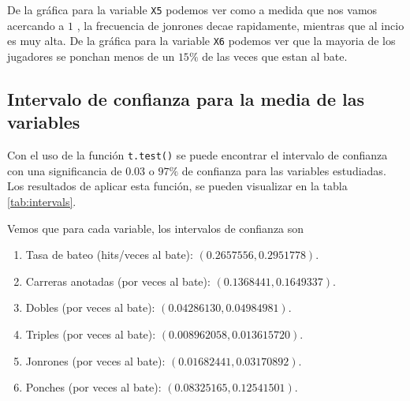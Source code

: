 \documentclass{staprojteamusb}
\begin{document}
 De la gráfica para la variable \texttt{X5} podemos ver como a medida que nos vamos acercando a \(1\) , la frecuencia de jonrones decae rapidamente, mientras que al incio es muy alta. De la gráfica para la variable \texttt{X6} podemos ver que la mayoria de los jugadores se ponchan menos de un \(15\%\) de las veces que estan al bate.

 \hypertarget{intervalo-de-confianza-para-la-media-de-las-variables}{%
 \subsection{Intervalo de confianza para la media de las variables}\label{intervalo-de-confianza-para-la-media-de-las-variables}}

 Con el uso de la función \texttt{t.test()} se puede encontrar el intervalo de confianza con una significancia de \(0.03\) o \(97\%\) de confianza para las variables estudiadas. Los resultados de aplicar esta función, se pueden visualizar en la tabla \ref{tab:intervals}.

 \begin{table}
 \caption{\label{tab:intervals}Intervalos del 97\% de confianza para las medias de las variables}
 \centering
 \end{table}

 Vemos que para cada variable, los intervalos de confianza son

 \begin{enumerate}
   \item Tasa de bateo (hits/veces al bate): $(0.2657556, 0.2951778)$.
   \item Carreras anotadas (por veces al bate): $(0.1368441, 0.1649337)$.
   \item Dobles (por veces al bate): $(0.04286130, 0.04984981)$.
   \item Triples (por veces al bate): $(0.008962058, 0.013615720)$.
   \item Jonrones (por veces al bate): $(0.01682441, 0.03170892)$.
   \item Ponches (por veces al bate): $(0.08325165, 0.12541501)$.
 \end{enumerate}
\end{document}
